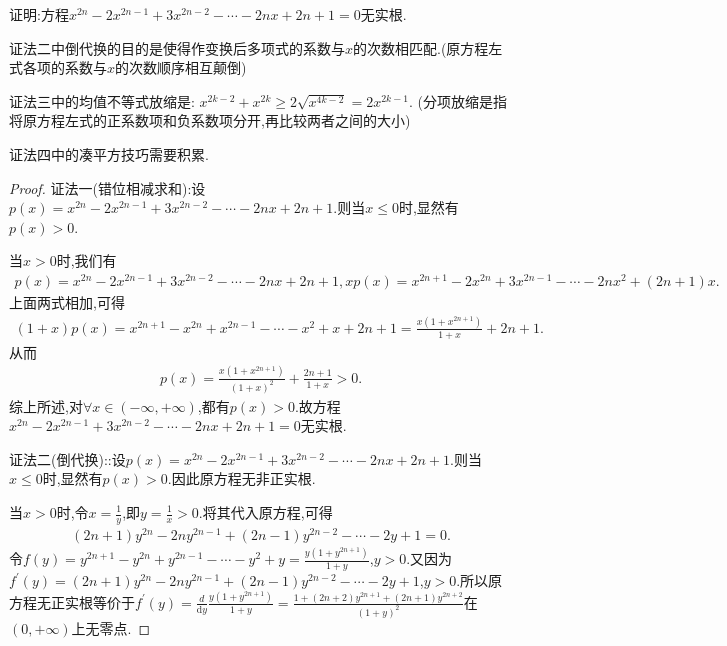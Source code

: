 \documentclass[lang=cn,newtx,10pt,scheme=chinese]{../Template/elegantbook}
\begin{document}
\begin{exercise}
    证明:方程\(x^{2n}-2x^{2n - 1}+3x^{2n - 2}-\cdots - 2nx + 2n + 1 = 0\)无实根.
\end{exercise}
\begin{note}\label{note:1.1111}
    {\color{blue}证法二}中倒代换的目的是使得作变换后多项式的系数与$x$的次数相匹配.(原方程左式各项的系数与$x$的次数顺序相互颠倒)

    {\color{blue}证法三}中的均值不等式放缩是:
    $x^{2k-2}+x^{2k}\geqslant  2\sqrt{x^{4k-2}}=2x^{2k-1}$.
    (分项放缩是指将原方程左式的正系数项和负系数项分开,再比较两者之间的大小)

    {\color{blue}证法四}中的凑平方技巧需要积累.
\end{note}
\begin{proof}
    {\color{blue}证法一(错位相减求和):}设\(p(x) = x^{2n} - 2x^{2n - 1} + 3x^{2n - 2} - \cdots - 2nx + 2n + 1\).则当\(x \leqslant  0\)时,显然有\(p(x) > 0\).

    当\(x > 0\)时,我们有
    \begin{align*}
        p(x) = x^{2n} - 2x^{2n - 1} + 3x^{2n - 2} - \cdots - 2nx + 2n + 1,
    xp(x) = x^{2n + 1} - 2x^{2n} + 3x^{2n - 1} - \cdots - 2nx^2 + (2n + 1)x.
    \end{align*}
    上面两式相加,可得
    \begin{align*}
        (1 + x)p(x) = x^{2n + 1} - x^{2n} + x^{2n - 1} - \cdots - x^2 + x + 2n + 1 = \frac{x(1 + x^{2n + 1})}{1 + x} + 2n + 1.
    \end{align*}
    从而
    \begin{align*}
        p(x) = \frac{x(1 + x^{2n + 1})}{(1 + x)^2} + \frac{2n + 1}{1 + x} > 0.
    \end{align*}
    综上所述,对\(\forall x\in (-\infty, +\infty)\),都有\(p(x) > 0\).故方程\(x^{2n} - 2x^{2n - 1} + 3x^{2n - 2} - \cdots - 2nx + 2n + 1 = 0\)无实根.
    
    {\color{blue}证法二(倒代换):}:设\(p(x) = x^{2n} - 2x^{2n - 1} + 3x^{2n - 2} - \cdots - 2nx + 2n + 1\).则当\(x \leqslant  0\)时,显然有\(p(x) > 0\).因此原方程无非正实根.
    
    当\(x > 0\)时,令\(x = \frac{1}{y}\),即\(y = \frac{1}{x} > 0\).将其代入原方程,可得
    \begin{align*}
      (2n + 1)y^{2n} - 2ny^{2n - 1} + (2n - 1)y^{2n - 2} - \cdots - 2y + 1 = 0 .
    \end{align*}
    令\(f(y) = y^{2n + 1} - y^{2n} + y^{2n - 1} - \cdots - y^2 + y = \frac{y(1 + y^{2n + 1})}{1 + y}\),\(y > 0\).又因为\(f^{\prime}(y) = (2n + 1)y^{2n} - 2ny^{2n - 1} + (2n - 1)y^{2n - 2} - \cdots - 2y + 1\),\(y > 0\).所以原方程无正实根等价于\(f^{\prime}(y) = \frac{d}{\mathrm{d}y}\frac{y(1 + y^{2n + 1})}{1 + y} = \frac{1 + (2n + 2)y^{2n + 1} + (2n + 1)y^{2n + 2}}{(1 + y)^2}\)在\((0, +\infty)\)上无零点.
    

\end{proof}
\end{document}
